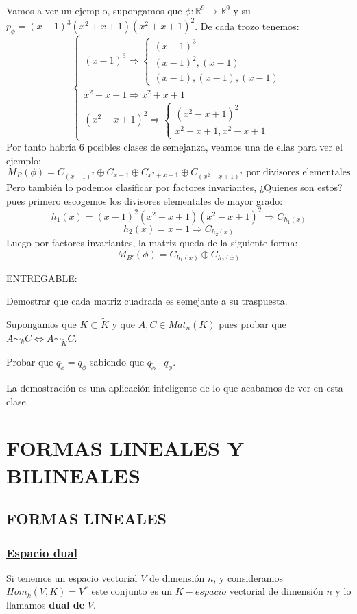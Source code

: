 \documentclass[10pt,a4paper,openright]{book}
\begin{document}
Vamos a ver un ejemplo, supongamos que $\phi: \mathbb R^9\rightarrow \mathbb R^9$ y su $p_\phi= (x-1)^3(x^2+x+1)(x^2+x+1)^2$. De cada trozo tenemos:
$$\begin{cases}(x-1)^3 \Rightarrow \begin{cases} (x-1)^3 \\ (x-1)^2, (x-1) \\ (x-1), (x-1), (x-1) \end{cases} \\ x^2+x+1 \Rightarrow x^2+x+1\\ (x^2-x+1)^2\Rightarrow \begin{cases}(x^2-x+1)^2 \\ x^2-x+1, x^2-x+1 \end{cases}\end{cases}$$
Por tanto habría 6 posibles clases de semejanza, veamos una de ellas para ver el ejemplo:
$$M_B(\phi)=C_{(x-1)^2}\oplus C_{x-1}\oplus C_{x^2+x+1}\oplus C_{(x^2-x+1)^2}\mbox{	 por divisores elementales}$$
Pero también lo podemos clasificar por factores invariantes, ¿Quienes son estos? pues primero escogemos los divisores elementales de mayor grado:
$$h_1(x)=(x-1)^2(x^2+x+1)(x^2-x+1)^2\Rightarrow C_{h_1(x)}$$
$$h_2(x)=x-1\Rightarrow C_{h_2(x)}$$
Luego por factores invariantes, la matriz queda de la siguiente forma:
$$M_{B'}(\phi)=C_{h_1(x)}\oplus C_{h_2(x)}$$

ENTREGABLE:

Demostrar que cada matriz cuadrada es semejante a su traspuesta.

Supongamos que $K\subset \tilde{K}$ y que $A, C\in Mat_n(K)$ pues probar que $A\sim_k C\Leftrightarrow A\sim_{\tilde{K}} C$.

Probar que $q_{\tilde{\phi}}=q_\phi$ sabiendo que $q_{\tilde{\phi}}\mid q_\phi$.

La demostración es una aplicación inteligente de lo que acabamos de ver en esta clase.

\chapter*{FORMAS LINEALES Y \\BILINEALES}
\section*{FORMAS LINEALES}
\subsection*{\underline{Espacio dual}}
Si tenemos un espacio vectorial $V$ de dimensión $n$, y consideramos $Hom_k(V,K)= V^*$ este conjunto es un $K-espacio$ vectorial de dimensión $n$ y lo llamamos \textbf{dual de }$V$.
\end{document}
